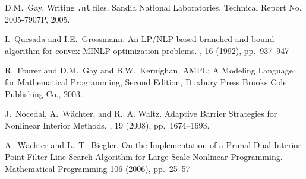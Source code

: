 \begin{thebibliography}{10}
D.M.~Gay.
\newblock Writing \texttt{.nl} files.
\newblock Sandia National Laboratories, Technical Report No. 2005-7907P, 2005.

I.~Quesada and I.E.~Grossmann.
\newblock An {LP/NLP} based branched and bound algorithm for convex {MINLP} optimization problems.
, 16 (1992), pp.~937--947

R.~Fourer and D.M.~Gay and B.W.~Kernighan.
\newblock AMPL: A Modeling Language for Mathematical
Programming, Second Edition,
\newblock Duxbury Press Brooks Cole Publishing Co., 2003.


J.~Nocedal, A.~W\"achter, and R.~A. Waltz.
\newblock Adaptive Barrier Strategies for Nonlinear Interior Methods.
, 19 (2008), pp.~1674--1693.

A.~W\"achter and L.~T.~Biegler.
\newblock On the Implementation of a Primal-Dual Interior Point Filter Line Search Algorithm for Large-Scale Nonlinear Programming.
\newblock Mathematical Programming 106 (2006), pp.~25--57
\end{thebibliography}
